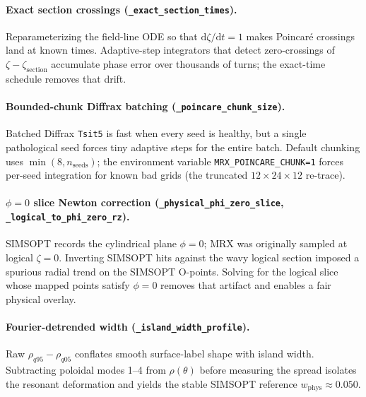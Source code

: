 \documentclass[11pt,a4paper]{article}
\begin{document}
\paragraph{Exact section crossings
(\texttt{\_exact\_section\_times}).}
Reparameterizing the field-line ODE so that \(\mathrm{d}\zeta/\mathrm{d}t=1\)
makes Poincaré crossings land at known times.  Adaptive-step integrators that
detect zero-crossings of \(\zeta-\zeta_{\mathrm{section}}\) accumulate phase
error over thousands of turns; the exact-time schedule removes that drift.

\paragraph{Bounded-chunk Diffrax batching
(\texttt{\_poincare\_chunk\_size}).}
Batched Diffrax \texttt{Tsit5} is fast when every seed is healthy, but a
single pathological seed forces tiny adaptive steps for the entire batch.
Default chunking uses \(\min(8,n_{\mathrm{seeds}})\); the environment variable
\texttt{MRX\_POINCARE\_CHUNK=1} forces per-seed integration for known bad
grids (the truncated \(12\times24\times12\) re-trace).

\paragraph{\(\phi=0\) slice Newton correction
(\texttt{\_physical\_phi\_zero\_slice},
\texttt{\_logical\_to\_phi\_zero\_rz}).}
SIMSOPT records the cylindrical plane \(\phi=0\); MRX was originally sampled
at logical \(\zeta=0\).  Inverting SIMSOPT hits against the wavy logical
section imposed a spurious radial trend on the SIMSOPT O-points.  Solving for
the logical slice whose mapped points satisfy \(\phi=0\) removes that
artifact and enables a fair physical overlay.

\paragraph{Fourier-detrended width
(\texttt{\_island\_width\_profile}).}
Raw \(\rho_{q95}-\rho_{q05}\) conflates smooth surface-label shape with
island width.  Subtracting poloidal modes 1--4 from \(\rho(\theta)\) before
measuring the spread isolates the resonant deformation and yields the stable
SIMSOPT reference \(w_{\mathrm{phys}}\approx0.050\).
\end{document}
